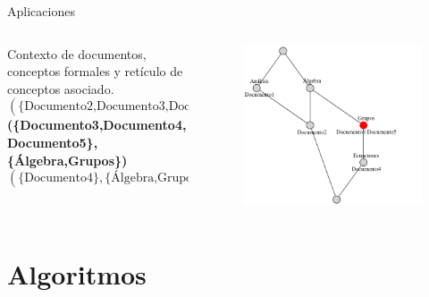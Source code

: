 \documentclass{beamer}
\begin{document}
\begin{frame}{Aplicaciones}
\begin{columns}
\begin{column}{0.5\textwidth}
\begin{table}[H]
{    }
    \end{table}
    \vspace{-2mm}
    \centering
    Contexto de documentos, conceptos formales y retículo de conceptos asociado.
    \tiny{
    $$(\{\text{Documento2,Documento3,Documento5,Documento4}\},\{\text{Álgebra}\})$$
    {\color{Maroon} \textbf{(\{Documento3,Documento4,Documento5\},\{Álgebra,Grupos\})}}
    $$(\{\text{Documento4}\},\{\text{Álgebra,Grupos,Ecuaciones}\})$$
    }
    \end{column}
    \begin{column}{0.5\textwidth}
    \begin{center}
    \hspace{3mm}
            \begin{figure}[H]
            \includegraphics[scale=0.3]{images/documentos.png}
            \end{figure}
        \end{center}
    \end{column}
    \end{columns}

       
   \end{frame}
  \fi
\section{Algoritmos}
 
\end{document}

